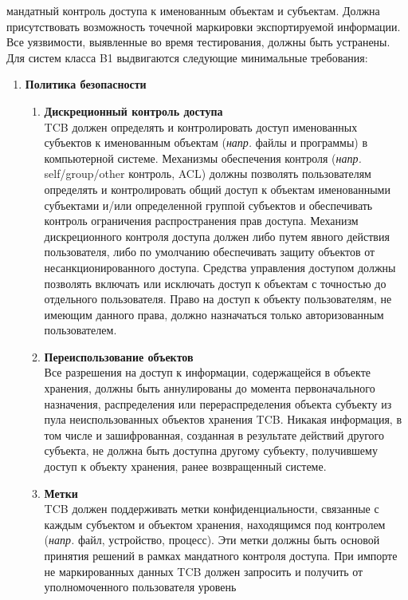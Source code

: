 \begin{enumerate}
\begin{enumerate}
		мандатный контроль доступа к именованным объектам и субъектам. Должна присутствовать возможность точечной маркировки экспортируемой информации. Все уязвимости, выявленные во время тестирования,
		должны быть устранены. Для систем класса B1 выдвигаются следующие минимальные требования:
        \begin{enumerate}
            \item{\textbf{Политика безопасности}}
            \begin{enumerate}
                \item{\textbf{Дискреционный контроль доступа}}\\
                TCB должен определять и контролировать доступ именованных субъектов к именованным объектам (\textit{напр.} файлы и программы) в компьютерной системе. Механизмы обеспечения контроля
                (\textit{напр.} self/group/other контроль, ACL) должны позволять пользователям определять и контролировать общий доступ к объектам именованными субъектами и/или определенной группой
                субъектов и обеспечивать контроль ограничения распространения прав доступа. Механизм дискреционного контроля доступа должен либо путем явного действия пользователя, либо по умолчанию
                обеспечивать защиту объектов от несанкционированного доступа. Средства управления доступом должны позволять включать или исключать доступ к объектам с точностью до отдельного
                пользователя. Право на доступ к объекту пользователям, не имеющим данного права, должно назначаться только авторизованным пользователем.
                \item{\textbf{Переиспользование объектов}}\\
                Все разрешения на доступ к информации, содержащейся в объекте хранения, должны быть аннулированы до момента первоначального назначения, распределения или перераспределения объекта
                субъекту из пула неиспользованных объектов хранения TCB. Никакая информация, в том числе и зашифрованная, созданная в результате действий другого субъекта, не должна быть доступна
                другому субъекту, получившему доступ к объекту хранения, ранее возвращенный системе.
                \item{\textbf{Метки}}\\
                TCB должен поддерживать метки конфиденциальности, связанные с каждым субъектом и объектом хранения, находящимся под контролем (\textit{напр.} файл, устройство, процесс). Эти метки должны
                быть основой принятия решений в рамках мандатного контроля доступа. При импорте не маркированных данных TCB должен запросить и получить от уполномоченного пользователя уровень

\end{enumerate}
\end{enumerate}
\end{enumerate}
\end{enumerate}
